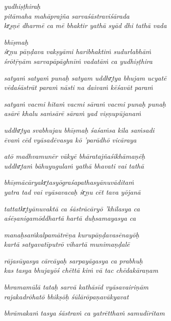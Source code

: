 \begin{pullquote}\raggedright
      

	\emph{yudhiṣṭhiraḥ  \Dash }\\
\emph{pitāmaha mahāprajña sarvaśāstraviśārada}\\
\emph{kr̥ṣṇē dharmē ca mē bhaktir yathā syād dhi tathā vada}



	\emph{bhīṣmaḥ  \Dash }\\
\emph{śr̥ṇu pāṇḍava vakṣyāmi haribhaktiṁ sudurlabhāṁ}\\
\emph{śrōtṝṇām sarvapāpāghnīṁ vadatāṁ ca yudhiṣṭhira}

\emph{satyaṁ satyaṁ punaḥ satyam uddhr̥tya bhujam ucyatē}\\
\emph{vēdaśāstrāt paraṁ nāsti na daivaṁ kēśavāt paraṁ}

\emph{satyaṁ vacmi hitaṁ vacmi sāraṁ vacmi punaḥ punaḥ}\\
\emph{asārē khalu saṁsārē sāraṁ yad viṣṇupūjanaṁ}

\emph{uddhr̥tya svabhujau bhīṣmaḥ śaśaṁsa kila saṁsadi}\\
\emph{ēvaṁ cēd vyāsadēvasya kō ’parādhō vicāraya}

\emph{atō madhvamunēr vākyē bhāratajñaśikhāmaṇēḥ}\\
\emph{uddhr̥taṁ bāhuyugulaṁ yathā bhavati vai tathā}

\emph{bhīṣmācāryakr̥tasyōgraśapathasyānuvāditaṁ}\\
\emph{yatra tad vai vyāsavacaḥ śr̥ṇu cēt tava yōjanā}

\emph{tattatkr̥tyānuvaktā ca śāstrācāryō ’khilasya ca}\\
\emph{aśēṣanigamōddhartā hartā duḥsamayasya ca}

\emph{manaḥsaṁkalpamātrēṇa kurupāṇḍavasēnayōḥ}\\
\emph{kartā satyavatīputrō vihartā munimaṇḍalē}

\emph{rājasūyasya cārcāyaḥ sarpayāgasya ca prabhuḥ}\\
\emph{kas tasya bhujayōś chēttā kiṁ vā tac chēdakāraṇam}

\emph{bhramamūlā tataḥ sarvā kathāsīd vyāsavairiṇām}\\
\emph{rajakadrōhatō bhikṣōḥ śūlārōpaṇavākyavat}

\emph{bhrāmakaṁ tasya śāstraṁ ca yatrētthaṁ samudīritam}
\end{pullquote}
      
